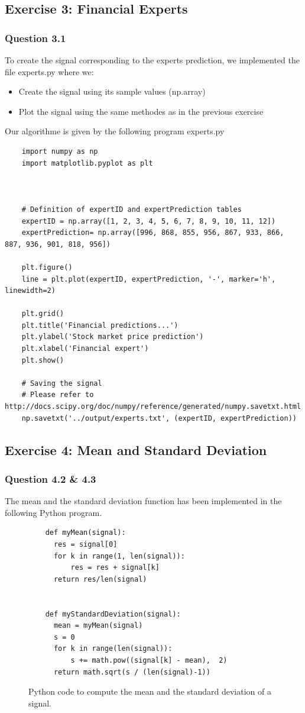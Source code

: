 \documentclass[a4paper,10pt]{article}
\begin{document}
    \subsection{Exercise 3: Financial Experts}
	\subsubsection{Question 3.1}
	    To create the signal corresponding to the experts prediction, we implemented the file experts.py where we:
	    \begin{itemize}
	    \item Create the signal using its sample values (np.array)
	    \item Plot the signal using the same methodes as in the previous exercise
	    \end{itemize}
	    Our algorithme is given by the following program experts.py
	    \begin{lstlisting}
    import numpy as np
    import matplotlib.pyplot as plt



    # Definition of expertID and expertPrediction tables
    expertID = np.array([1, 2, 3, 4, 5, 6, 7, 8, 9, 10, 11, 12])
    expertPrediction= np.array([996, 868, 855, 956, 867, 933, 866, 887, 936, 901, 818, 956])

    plt.figure()
    line = plt.plot(expertID, expertPrediction, '-', marker='h', linewidth=2)

    plt.grid()
    plt.title('Financial predictions...')
    plt.ylabel('Stock market price prediction')
    plt.xlabel('Financial expert')
    plt.show()

    # Saving the signal
    # Please refer to http://docs.scipy.org/doc/numpy/reference/generated/numpy.savetxt.html
    np.savetxt('../output/experts.txt', (expertID, expertPrediction))
	    \end{lstlisting}

    \subsection{Exercise 4: Mean and Standard Deviation }
	\subsubsection{Question 4.2 \& 4.3}
	    The mean and the standard deviation function has been implemented in the following Python program.
	    \begin{figure}[ht!]
	      \lstset{language=Python}
	      \begin{lstlisting}
    def myMean(signal):
      res = signal[0]
      for k in range(1, len(signal)):
	      res = res + signal[k]
      return res/len(signal)


    def myStandardDeviation(signal):
      mean = myMean(signal)
      s	= 0
      for k in range(len(signal)):
	      s += math.pow((signal[k] - mean),  2)
      return math.sqrt(s / (len(signal)-1))
	      \end{lstlisting}
	      \caption{Python code to compute the mean and the standard deviation of a signal.}
	      \label{ispFunctions_mean_stdDeviation.py}
	    \end{figure}
\end{document}
